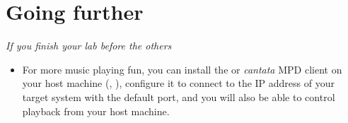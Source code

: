 \section{Going further}

{\em If you finish your lab before the others}

\begin{itemize}
\item For more music playing fun, you can install the  or
  {\em cantata} MPD client on your host machine (, ), configure it to
  connect to the IP address of your target system with the default
  port, and you will also be able to control playback from your host
  machine.
\end{itemize}

